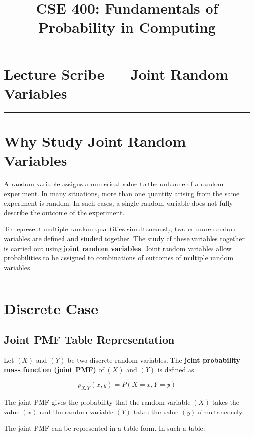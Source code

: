 \documentclass[12pt]{article}
\begin{document}
\title{CSE 400: Fundamentals of Probability in Computing}
\author{}
\date{}
\maketitle

\section*{Lecture Scribe — Joint Random Variables}

\hrule
\vspace{0.5cm}

\section*{Why Study Joint Random Variables}

A random variable assigns a numerical value to the outcome of a random experiment. In many situations, more than one quantity arising from the same experiment is random. In such cases, a single random variable does not fully describe the outcome of the experiment.

To represent multiple random quantities simultaneously, two or more random variables are defined and studied together. The study of these variables together is carried out using \textbf{joint random variables}. Joint random variables allow probabilities to be assigned to combinations of outcomes of multiple random variables.

\hrule
\vspace{0.5cm}

\section*{Discrete Case}

\subsection*{Joint PMF Table Representation}

Let $(X)$ and $(Y)$ be two discrete random variables. The \textbf{joint probability mass function (joint PMF)} of $(X)$ and $(Y)$ is defined as

\[
p_{X,Y}(x,y) = P(X = x, Y = y)
\]

The joint PMF gives the probability that the random variable $(X)$ takes the value $(x)$ and the random variable $(Y)$ takes the value $(y)$ simultaneously.

The joint PMF can be represented in a table form. In such a table:
\end{document}
